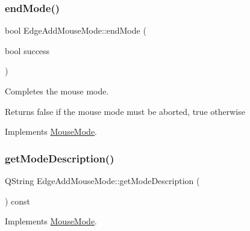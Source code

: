 \mbox{\label{class_edge_add_mouse_mode_aa78402058c8efd76035be5f22109899d}} 
\subsubsection{\texorpdfstring{endMode()}{endMode()}}
{\footnotesize\ttfamily bool Edge\+Add\+Mouse\+Mode\+::end\+Mode (\begin{DoxyParamCaption}\item[{bool}]{success }\end{DoxyParamCaption})\hspace{0.3cm}{\ttfamily [virtual]}}



Completes the mouse mode. 

\begin{DoxyReturn}{Returns}
false if the mouse mode must be aborted, true otherwise 
\end{DoxyReturn}


Implements \mbox{\hyperlink{class_mouse_mode_ad88ebf649b48364a343c86c14513039e}{Mouse\+Mode}}.

\mbox{\label{class_edge_add_mouse_mode_a1066045f847ba4ccfcd23d525b86c72b}} 
\subsubsection{\texorpdfstring{getModeDescription()}{getModeDescription()}}
{\footnotesize\ttfamily Q\+String Edge\+Add\+Mouse\+Mode\+::get\+Mode\+Description (\begin{DoxyParamCaption}{ }\end{DoxyParamCaption}) const\hspace{0.3cm}{\ttfamily [virtual]}}



Implements \mbox{\hyperlink{class_mouse_mode_aa442d3058243efe81e8052a137c2072e}{Mouse\+Mode}}.

\mbox{\label{class_edge_add_mouse_mode_aee2cc27c8e2d482869c885b94d944026}} 
